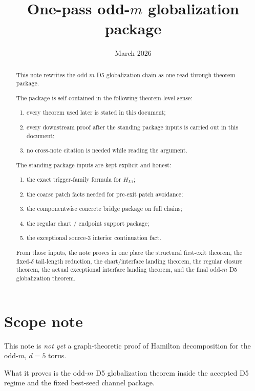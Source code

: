 \documentclass[11pt]{article}
\title{One-pass odd-$m$ globalization package}
\author{}
\date{March 2026}
\begin{document}
\maketitle

\begin{abstract}
This note rewrites the odd-$m$ D5 globalization chain as one read-through
theorem package.

The package is self-contained in the following theorem-level sense:
\begin{enumerate}[label=\textup{(\arabic*)},leftmargin=2.5em]
\item every theorem used later is stated in this document;
\item every downstream proof after the standing package inputs is carried out
      in this document;
\item no cross-note citation is needed while reading the argument.
\end{enumerate}

The standing package inputs are kept explicit and honest:
\begin{enumerate}[label=\textup{(\arabic*)},leftmargin=2.5em]
\item the exact trigger-family formula for $H_{L1}$;
\item the coarse patch facts needed for pre-exit patch avoidance;
\item the componentwise concrete bridge package on full chains;
\item the regular chart / endpoint support package;
\item the exceptional source-$3$ interior continuation fact.
\end{enumerate}

From those inputs, the note proves in one place the structural first-exit
theorem, the fixed-$\delta$ tail-length reduction, the chart/interface landing
theorem, the regular closure theorem, the actual exceptional interface landing
theorem, and the final odd-$m$ D5 globalization theorem.
\end{abstract}

\section*{Scope note}

This note is \emph{not yet} a graph-theoretic proof of Hamilton decomposition
for the odd-$m$, $d=5$ torus.

What it proves is the odd-$m$ D5 globalization theorem inside the accepted D5
regime and the fixed best-seed channel package.
\end{document}
